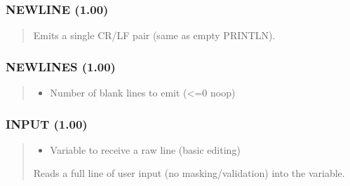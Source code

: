 \documentclass[letterpaper,10pt,english]{sphinxmanual}
\begin{document}
\subsubsection{NEWLINE (1.00)}
\label{\detokenize{ppl:newline-1-00}}\begin{quote}

\sphinxAtStartPar
{}
\begin{description}
\sphinxAtStartPar
Emits a single CR/LF pair (same as empty PRINTLN).

\end{description}
\end{quote}


\subsubsection{NEWLINES (1.00)}
\label{\detokenize{ppl:newlines-1-00}}\begin{quote}

\sphinxAtStartPar
{}
\begin{description}
\begin{itemize}
\item {} 
\sphinxAtStartPar
{} \textendash{} Number of blank lines to emit (\textless{}=0 no\sphinxhyphen{}op)

\end{itemize}

\end{description}
\end{quote}


\subsubsection{INPUT (1.00)}
\label{\detokenize{ppl:input-1-00}}\begin{quote}

\sphinxAtStartPar
{}
\begin{description}
\begin{itemize}
\item {} 
\sphinxAtStartPar
{} \textendash{} Variable to receive a raw line (basic editing)

\end{itemize}

\sphinxAtStartPar
Reads a full line of user input (no masking/validation) into the variable.

\end{description}
\end{quote}
\end{document}
